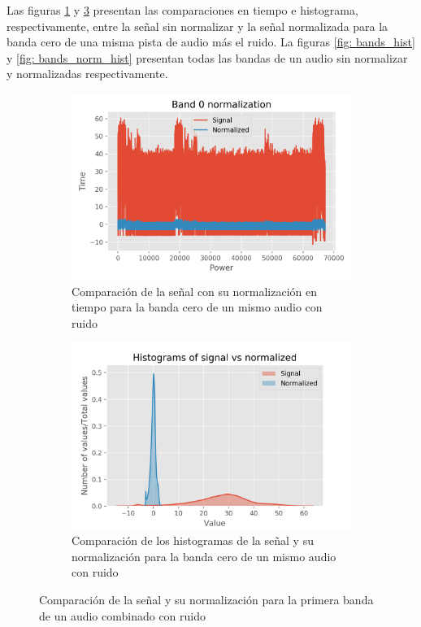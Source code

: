 Las figuras \ref{fig: norm_time} y \ref{fig: norm_hist} presentan las comparaciones en tiempo e histograma, respectivamente, entre la señal sin normalizar y la señal normalizada para la banda cero de una misma pista de audio más el ruido. La figuras \ref{fig: bands_hist} y \ref{fig: bands_norm_hist} presentan todas las bandas de un audio sin normalizar y normalizadas respectivamente.

\begin{figure}[t!]
	\centering
	\begin{subfigure}[t]{0.5\textwidth}
		\centering
		\includegraphics[width=\columnwidth]{figures/band0_norm}
		\caption{Comparación de la señal con su normalización en tiempo para la banda cero de un mismo audio con ruido}
		\label{fig: norm_time}
	\end{subfigure}%
	\hspace*{10pt}
	\begin{subfigure}[t]{0.5\textwidth}
		\centering
		\includegraphics[width=\columnwidth]{figures/band0_norm_hist}
		\caption{Comparación de los histogramas de la señal y su normalización para la banda cero de un mismo audio con ruido}
		\label{fig: norm_hist}
	\end{subfigure}
	\caption{Comparación de la señal y su normalización para la primera banda de un audio combinado con ruido}
\end{figure}

